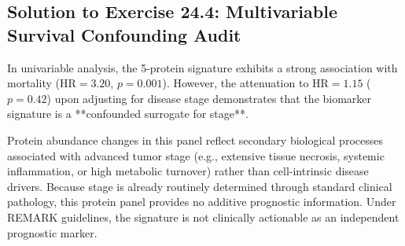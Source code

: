 \documentclass[11pt,twoside,openright]{book}
\begin{document}
\subsection{Solution to Exercise 24.4: Multivariable Survival Confounding Audit}

In univariable analysis, the 5-protein signature exhibits a strong association with mortality ($\text{HR} = 3.20$, $p = 0.001$). However, the attenuation to $\text{HR} = 1.15$ ($p = 0.42$) upon adjusting for disease stage demonstrates that the biomarker signature is a **confounded surrogate for stage**.

Protein abundance changes in this panel reflect secondary biological processes associated with advanced tumor stage (e.g., extensive tissue necrosis, systemic inflammation, or high metabolic turnover) rather than cell-intrinsic disease drivers. Because stage is already routinely determined through standard clinical pathology, this protein panel provides no additive prognostic information. Under REMARK guidelines, the signature is not clinically actionable as an independent prognostic marker.

\end{document}

